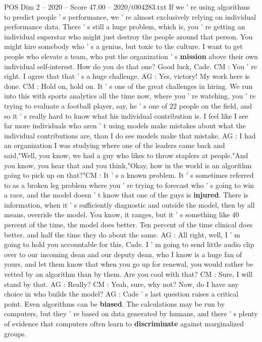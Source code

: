 \begin{textsample}{POS Dim 2 – 2020 – Score 47.00 – 2020/t004283.txt}
If we ' re using algorithms to predict people ' s performance, we ' re almost exclusively relying on individual performance data.
There ' s still a huge problem, which is, you ' re getting an individual superstar who might just destroy the people around that person.
You might hire somebody who ' s a genius, but toxic to the culture.
I want to get people who elevate a team, who put the organization ' s \textbf{mission} above their own individual self-interest.
How do you do that one?
Good luck, Cade.
CM : You ' re right.
I agree that that ' s a huge challenge.
AG : Yes, victory!
My work here is done.
CM : Hold on, hold on.
It ' s one of the great challenges in hiring.
We run into this with sports analytics all the time now, where you ' re watching, you ' re trying to evaluate a football player, say, he ' s one of 22 people on the field, and so it ' s really hard to know what his individual contribution is.
I feel like I see far more individuals who aren ' t using models make mistakes about what the individual contributions are, than I do see models make that mistake.
AG : I had an organization I was studying where one of the leaders came back and said,"Well, you know, we had a guy who likes to throw staplers at people."And you know, you hear that and you think,"Okay, how in the world is an algorithm going to pick up on that?"CM : It ' s a known problem.
It ' s sometimes referred to as a broken leg problem where you ' re trying to forecast who ' s going to win a race, and the model doesn ' t know that one of the guys is \textbf{injured}.
There is information, when it ' s sufficiently diagnostic and outside the model, then by all means, override the model.
You know, it ranges, but it ' s something like 40 percent of the time, the model does better.
Ten percent of the time clinical does better, and half the time they do about the same.
AG : All right, well, I ' m going to hold you accountable for this, Cade.
I ' m going to send little audio clip over to our incoming dean and our deputy dean, who I know is a huge fan of yours, and let them know that when you go up for renewal, you would rather be vetted by an algorithm than by them.
Are you cool with that?
CM : Sure, I will stand by that.
AG : Really?
CM : Yeah, sure, why not?
Now, do I have any choice in who builds the model?
AG : Cade ' s last question raises a critical point.
Even algorithms can be \textbf{biased}.
The calculations may be run by computers, but they ' re based on data generated by humans, and there ' s plenty of evidence that computers often learn to \textbf{discriminate} against marginalized groups.

\end{textsample}
